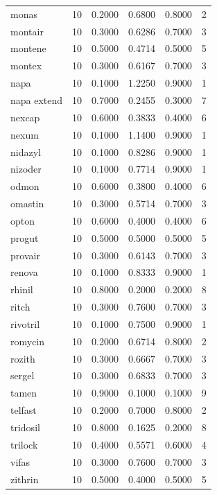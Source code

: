 \begin{longtable}{p{3.0cm}rrrrr}
monas & 10 & 0.2000 & 0.6800 & 0.8000 & 2 \\
montair & 10 & 0.3000 & 0.6286 & 0.7000 & 3 \\
montene & 10 & 0.5000 & 0.4714 & 0.5000 & 5 \\
montex & 10 & 0.3000 & 0.6167 & 0.7000 & 3 \\
napa & 10 & 0.1000 & 1.2250 & 0.9000 & 1 \\
napa extend & 10 & 0.7000 & 0.2455 & 0.3000 & 7 \\
nexcap & 10 & 0.6000 & 0.3833 & 0.4000 & 6 \\
nexum & 10 & 0.1000 & 1.1400 & 0.9000 & 1 \\
nidazyl & 10 & 0.1000 & 0.8286 & 0.9000 & 1 \\
nizoder & 10 & 0.1000 & 0.7714 & 0.9000 & 1 \\
odmon & 10 & 0.6000 & 0.3800 & 0.4000 & 6 \\
omastin & 10 & 0.3000 & 0.5714 & 0.7000 & 3 \\
opton & 10 & 0.6000 & 0.4000 & 0.4000 & 6 \\
progut & 10 & 0.5000 & 0.5000 & 0.5000 & 5 \\
provair & 10 & 0.3000 & 0.6143 & 0.7000 & 3 \\
renova & 10 & 0.1000 & 0.8333 & 0.9000 & 1 \\
rhinil & 10 & 0.8000 & 0.2000 & 0.2000 & 8 \\
ritch & 10 & 0.3000 & 0.7600 & 0.7000 & 3 \\
rivotril & 10 & 0.1000 & 0.7500 & 0.9000 & 1 \\
romycin & 10 & 0.2000 & 0.6714 & 0.8000 & 2 \\
rozith & 10 & 0.3000 & 0.6667 & 0.7000 & 3 \\
sergel & 10 & 0.3000 & 0.6833 & 0.7000 & 3 \\
tamen & 10 & 0.9000 & 0.1000 & 0.1000 & 9 \\
telfast & 10 & 0.2000 & 0.7000 & 0.8000 & 2 \\
tridosil & 10 & 0.8000 & 0.1625 & 0.2000 & 8 \\
trilock & 10 & 0.4000 & 0.5571 & 0.6000 & 4 \\
vifas & 10 & 0.3000 & 0.7600 & 0.7000 & 3 \\
zithrin & 10 & 0.5000 & 0.4000 & 0.5000 & 5 \\
\end{longtable}
\endgroup
